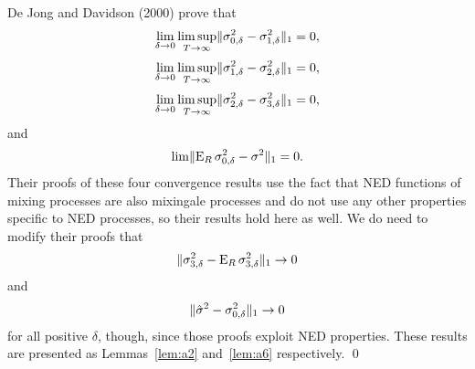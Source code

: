 \documentclass[12pt]{article}
\begin{document}
De Jong and Davidson (2000) prove that
\begin{equation*}
\lim_{\delta\to0} \limsup_{T\to\infty} \lVert \sigma_{0,\delta}^2 -
\sigma_{1,\delta}^2\rVert_1 = 0,
\end{equation*}
\begin{equation*}
\lim_{\delta\to0} \limsup_{T\to\infty} \lVert \sigma_{1,\delta}^2 - \sigma_{2,\delta}^{2}
\rVert_1 = 0,
\end{equation*}
\begin{equation*}
\lim_{\delta\to0} \limsup_{T\to\infty} \lVert \sigma_{2,\delta}^{2} - \sigma_{3,\delta}^{2}
\rVert_1 = 0,
\end{equation*}
and
\begin{equation*}
\lim \lVert \operatorname{E}_R \sigma_{0,\delta}^2 - \sigma^2 \rVert_1 = 0.
\end{equation*}
Their proofs of these four convergence results use the fact that NED
functions of mixing processes are also mixingale processes and do not
use any other properties specific to NED processes, so their results
hold here as well.  We do need to modify their proofs that
\begin{equation*}
  \lVert \sigma_{3,\delta}^{2} - \operatorname{E}_R \sigma_{3,\delta}^{2} \rVert_1 \to 0
\end{equation*}
and
\begin{equation*}
  \lVert \hat{\sigma}^2 - \sigma_{0,\delta}^2 \rVert_1 \to 0
\end{equation*}
for all positive $\delta$, though, since those proofs exploit NED
properties. These results are presented as Lemmas~\ref{lem:a2}
and~\ref{lem:a6} respectively.  \qed
\end{document}

